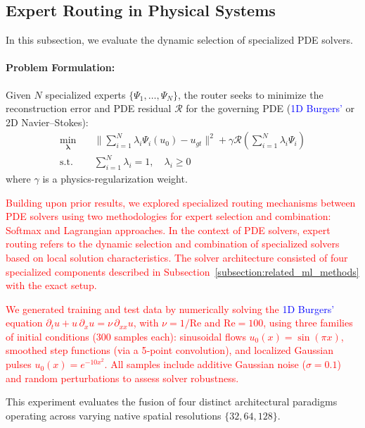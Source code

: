 \documentclass[preprint,12pt,authoryear]{elsarticle}
\begin{document}
\subsection{Expert Routing in Physical Systems}
\label{subsection:expert_routing_physical_systems}

In this subsection, we evaluate the dynamic selection of specialized PDE solvers. 

\paragraph{Problem Formulation:} Given $N$ specialized experts $\{\Psi_1, \dots, \Psi_N\}$, the router seeks to minimize the reconstruction error and PDE residual $\mathcal{R}$ for the governing PDE (\textcolor{blue}{1D Burgers'} or 2D Navier--Stokes):
\begin{equation}
\begin{aligned}
\min_{\mathbf{\lambda}} \quad & \| \sum_{i=1}^N \lambda_i \Psi_i(u_0) - u_{gt} \|^2 + \gamma \mathcal{R}(\sum_{i=1}^N \lambda_i \Psi_i) \\
\text{s.t.} \quad & \sum_{i=1}^N \lambda_i = 1, \quad \lambda_i \geq 0
\end{aligned}
\end{equation}
where $\gamma$ is a physics-regularization weight.

\textcolor{red}{Building upon prior results, we explored specialized routing mechanisms between PDE solvers using two methodologies for expert selection and combination: Softmax and Lagrangian approaches. In the context of PDE solvers, expert routing refers to the dynamic selection and combination of specialized solvers based on local solution characteristics. The solver architecture consisted of four specialized components described in Subsection~\ref{subsection:related_ml_methods} with the exact setup.}

\textcolor{red}{We generated training and test data by numerically solving the \textcolor{blue}{1D Burgers'} equation $\partial_t u + u\,\partial_x u = \nu\,\partial_{xx}u$, with $\nu = 1/\mathrm{Re}$ and $\mathrm{Re}=100$, using three families of initial conditions (300 samples each): sinusoidal flows $u_0(x)=\sin(\pi x)$, smoothed step functions (via a 5‐point convolution), and localized Gaussian pulses $u_0(x)=e^{-10x^2}$. All samples include additive Gaussian noise ($\sigma=0.1$) and random perturbations to assess solver robustness.}


This experiment evaluates the fusion of four distinct architectural paradigms operating across varying native spatial resolutions $\{32, 64, 128\}$.
\end{document}
